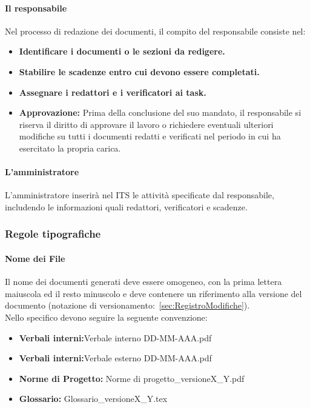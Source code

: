 \documentclass{article}
\begin{document}
    \paragraph{Il responsabile}
    Nel processo di redazione dei documenti, il compito del responsabile consiste nel: 
        \begin{itemize}
        \item \textbf{Identificare i documenti o le sezioni da redigere. }
        \item \textbf{Stabilire le scadenze entro cui devono essere completati.}
        \item \textbf{Assegnare i redattori e i verificatori ai task.}
        \item \textbf{Approvazione:} Prima della conclusione del suo mandato, il responsabile si riserva il diritto di approvare il lavoro o richiedere eventuali ulteriori modifiche su tutti i documenti redatti e verificati nel periodo in cui ha esercitato la propria carica.
    \end{itemize}
  
    \paragraph{L'amministratore}
    L'amministratore inserirà nel ITS le attività specificate dal responsabile, includendo le informazioni quali redattori, verificatori e scadenze.

    \subsubsection{Regole tipografiche}
    \paragraph*{Nome dei File}\label{sec:NomeFile}
    Il nome dei documenti generati deve essere omogeneo, con la prima lettera maiuscola ed il resto minuscolo e deve contenere un riferimento alla versione del documento (notazione di versionamento:~\ref{sec:RegistroModifiche}).\\
    Nello specifico devono seguire la seguente convenzione:
    \begin{itemize}
        \item \textbf{Verbali interni:}Verbale interno DD-MM-AAA.pdf
        \item \textbf{Verbali interni:}Verbale esterno DD-MM-AAA.pdf
        \item \textbf{Norme di Progetto:} Norme di progetto\_versioneX\_Y.pdf
        \item \textbf{Glossario:} Glossario\_versioneX\_Y.tex
    \end{itemize}
    
\end{document}
